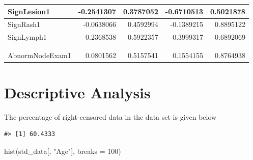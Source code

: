 \documentclass[
]{article}
\newenvironment{Shaded}{\begin{snugshade}}{\end{snugshade}}
\newcommand{\AttributeTok}[1]{\textcolor[rgb]{0.77,0.63,0.00}{#1}}
\newcommand{\DecValTok}[1]{\textcolor[rgb]{0.00,0.00,0.81}{#1}}
\newcommand{\FunctionTok}[1]{\textcolor[rgb]{0.00,0.00,0.00}{#1}}
\newcommand{\NormalTok}[1]{#1}
\newcommand{\SpecialCharTok}[1]{\textcolor[rgb]{0.00,0.00,0.00}{#1}}
\newcommand{\StringTok}[1]{\textcolor[rgb]{0.31,0.60,0.02}{#1}}
\begin{document}
\begin{table}
\begin{tabular}[t]{l|r|r|r|r}
\hline
SignLesion1 & -0.2541307 & 0.3787052 & -0.6710513 & 0.5021878\\
\hline
SignRash1 & -0.0638066 & 0.4592994 & -0.1389215 & 0.8895122\\
\hline
SignLymph1 & 0.2368538 & 0.5922357 & 0.3999317 & 0.6892069\\
\hline
\cellcolor{blue}{\textcolor{white}{InvVagAtExam1}} & \cellcolor{blue}{\textcolor{white}{0.5726933}} & \cellcolor{blue}{\textcolor{white}{0.2003764}} & \cellcolor{blue}{\textcolor{white}{2.8580874}} & \cellcolor{blue}{\textcolor{white}{0.0042620}}\\
\hline
\cellcolor{blue}{\textcolor{white}{DischargeExam1}} & \cellcolor{blue}{\textcolor{white}{-0.5805191}} & \cellcolor{blue}{\textcolor{white}{0.2691414}} & \cellcolor{blue}{\textcolor{white}{-2.1569301}} & \cellcolor{blue}{\textcolor{white}{0.0310111}}\\
\hline
AbnormNodeExam1 & 0.0801562 & 0.5157541 & 0.1554155 & 0.8764938\\
\hline
\end{tabular}
\end{table}

\hypertarget{descriptive-analysis}{%
\section{Descriptive Analysis}\label{descriptive-analysis}}

The percentage of right-censored data in the data set is given below

\begin{Shaded}
\end{Shaded}

\begin{verbatim}
#> [1] 60.4333
\end{verbatim}

\begin{Shaded}
\begin{Highlighting}[]
\FunctionTok{hist}\NormalTok{(std\_data[, }\StringTok{"Age"}\NormalTok{], }\AttributeTok{breaks =} \DecValTok{100}\NormalTok{)}
\end{Highlighting}
\end{Shaded}
\end{document}
